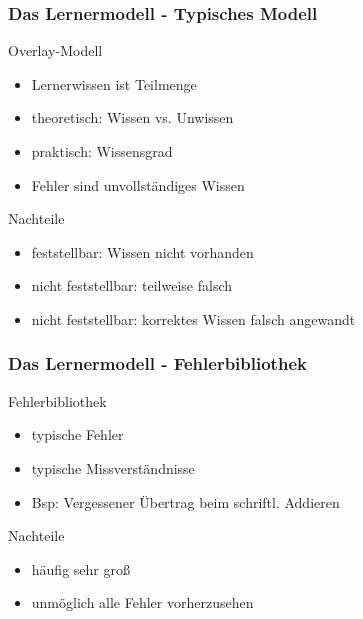 \documentclass{beamer}
\begin{document}
\begin{frame}
  \frametitle{Das Lernermodell - Typisches Modell}
  \begin{block}{Overlay-Modell}
    \begin{itemize}
      \item Lernerwissen ist Teilmenge
      \item theoretisch: Wissen vs. Unwissen
      \item praktisch: Wissensgrad
      \item Fehler sind unvollständiges Wissen
    \end{itemize}
  \end{block}

  \begin{alertblock}{Nachteile}
    \begin{itemize}
      \item feststellbar: Wissen nicht vorhanden
      \item nicht feststellbar: teilweise falsch
      \item nicht feststellbar: korrektes Wissen falsch angewandt
    \end{itemize}
  \end{alertblock}
\end{frame}

\begin{frame}
  \frametitle{Das Lernermodell - Fehlerbibliothek}
  \begin{block}{Fehlerbibliothek}
    \begin{itemize}
      \item typische Fehler
      \item typische Missverständnisse
      \item Bsp: Vergessener Übertrag beim schriftl. Addieren
    \end{itemize}
  \end{block}

  \begin{alertblock}{Nachteile}
    \begin{itemize}
      \item häufig sehr groß
      \item unmöglich alle Fehler vorherzusehen
    \end{itemize}
  \end{alertblock}
\end{frame}
\end{document}
